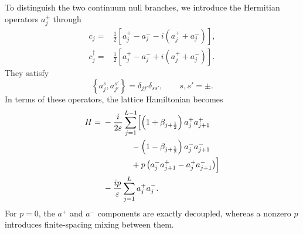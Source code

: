 \documentclass[reprint,amsmath,amssymb,aps,prb,showkeys,superscriptaddress]{revtex4-2}
\begin{document}
To distinguish the two continuum null branches, we introduce the
Hermitian operators $a_j^\pm$ through
\begin{subequations}
\label{eq:a_definition}
\begin{align}
  c_j
  ={}&
  \frac{1}{2}
  \left[
    a_j^+-a_j^-
    -i\left(a_j^++a_j^-\right)
  \right],
  \\
  c_j^\dagger
  ={}&
  \frac{1}{2}
  \left[
    a_j^+-a_j^-
    +i\left(a_j^++a_j^-\right)
  \right].
\end{align}
\end{subequations}
They satisfy
\begin{equation}
  \left\{
    a_j^s,a_{j'}^{s'}
  \right\}
  =
  \delta_{jj'}\delta_{ss'},
  \qquad
  s,s'=\pm.
  \label{eq:a_anticommutation}
\end{equation}
In terms of these operators, the lattice Hamiltonian becomes
\begin{align}
  H
  ={}&
  -\frac{i}{2\varepsilon}
  \sum_{j=1}^{L-1}
  \Bigl[
    \left(
      1+\beta_{j+\frac12}
    \right)
    a_j^+a_{j+1}^+
  \nonumber\\
  &\hspace{12mm}
    -
    \left(
      1-\beta_{j+\frac12}
    \right)
    a_j^-a_{j+1}^-
  \nonumber\\
  &\hspace{12mm}
    +
    p\left(
      a_j^-a_{j+1}^+
      -
      a_j^+a_{j+1}^-
    \right)
  \Bigr]
  \nonumber\\
  &-
  \frac{i p}{\varepsilon}
  \sum_{j=1}^{L}
  a_j^+a_j^- .
  \label{eq:H_in_a}
\end{align}
For $p=0$, the $a^+$ and $a^-$ components are exactly decoupled,
whereas a nonzero $p$ introduces finite-spacing mixing between them.
\end{document}
